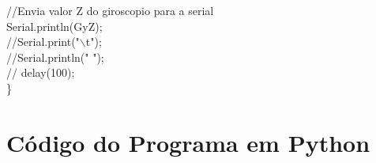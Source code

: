 \begin{anexosenv}
	//Envia valor Z do giroscopio para a serial\\ 
	Serial.println(GyZ);\\
	//Serial.print("$\backslash$t");\\
	//Serial.println(" ");\\
	// delay(100);\\
	
\}\\

\chapter{Código do Programa em Python}
\footnotesize
 
%
\end{anexosenv}

